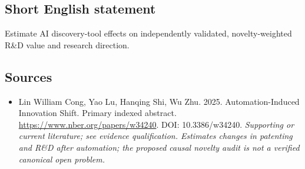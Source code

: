 \documentclass[11pt]{article}
\begin{document}
\subsection{Short English statement}
Estimate AI discovery-tool effects on independently validated, novelty-weighted R\&D value and research direction.

\subsection{Sources}
\begin{itemize}\raggedright
\item[\textnormal{[S1]}]\hypertarget{source:30007701:1}{} Lin William Cong, Yao Lu, Hanqing Shi, Wu Zhu. 2025. Automation-Induced Innovation Shift. Primary indexed abstract.
\url{https://www.nber.org/papers/w34240}.
DOI: 10.3386/w34240.
{\small\textit{Supporting or current literature; see evidence qualification. Estimates changes in patenting and R\&D after automation; the proposed causal novelty audit is not a verified canonical open problem.}}
\end{itemize}
\end{document}
